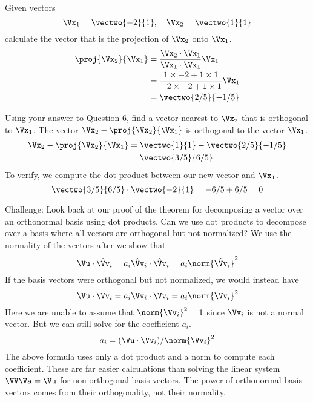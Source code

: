 \documentclass[12pt,ragged]{pajarticle}
\begin{document}
\begin{question}{6}{%
Given vectors
\[ \Vx_1 = \vectwo{-2}{1},\quad \Vx_2 = \vectwo{1}{1} \]
calculate the vector that is the projection of $\Vx_2$ onto $\Vx_1$.}{
\begin{align*}
	\proj{\Vx_2}{\Vx_1} &= \frac{\Vx_2\cdot\Vx_1	}{\Vx_1\cdot\Vx_1}\Vx_1 \\
	&= \frac{1\times-2 + 1\times1}{-2\times-2 + 1\times1}\Vx_1 \\
	&= \vectwo{2/5}{-1/5}
\end{align*}
}	
\end{question}

\begin{question}{7}{%
Using your answer to Question 6, find a vector nearest to $\Vx_2$ that is orthogonal to $\Vx_1$.}{
The vector $\Vx_2 - \proj{\Vx_2}{\Vx_1}$ is orthogonal to the vector $\Vx_1$.
\begin{align*}
	\Vx_2 - \proj{\Vx_2}{\Vx_1} &= \vectwo{1}{1} - \vectwo{2/5}{-1/5} \\
	&= \vectwo{3/5}{6/5}
\end{align*}
To verify, we compute the dot product between our new vector and $\Vx_1$.
\[ \vectwo{3/5}{6/5}\cdot\vectwo{-2}{1} = -6/5 + 6/5 = 0 \]
}
\end{question}

\begin{question}{8}{%
{\sc Challenge:} Look back at our proof of the theorem for decomposing a vector over an orthonormal basis using dot products. Can we use dot products to decompose over a basis where all vectors are orthogonal but not normalized?}{
We use the normality of the vectors after we show that
\[ \Vu\cdot\hat{\Vv}_i = a_i\hat{\Vv}_i\cdot\hat{\Vv}_i = a_i\norm{\hat{\Vv}_i}^2 \]
If the basis vectors were orthogonal but not normalized, we would instead have
\[ \Vu\cdot\Vv_i = a_i\Vv_i\cdot\Vv_i = a_i\norm{\Vv_i}^2 \]
Here we are unable to assume that $\norm{\Vv_i}^2 = 1$ since $\Vv_i$ is not a normal vector. But we can still solve for the coefficient $a_i$.
\[ a_i = (\Vu\cdot\Vv_i)/\norm{\Vv_i}^2 \]
The above formula uses only a dot product and a norm to compute each coefficient. These are far easier calculations than solving the linear system $\VV\Va = \Vu$ for non-orthogonal basis vectors. The power of orthonormal basis vectors comes from their orthogonality, not their normality.
}	
\end{question}
\end{document}
